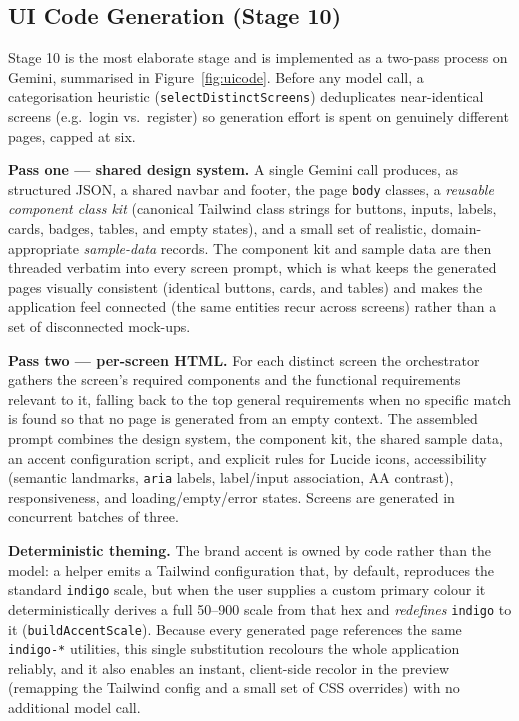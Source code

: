 \documentclass[12pt,a4paper,oneside]{report}
\begin{document}
\subsection{UI Code Generation (Stage 10)}
Stage 10 is the most elaborate stage and is implemented as a two-pass process on Gemini, summarised in Figure~\ref{fig:uicode}. Before any model call, a categorisation heuristic (\texttt{selectDistinctScreens}) deduplicates near-identical screens (e.g.\ login vs.\ register) so generation effort is spent on genuinely different pages, capped at six.

\textbf{Pass one --- shared design system.} A single Gemini call produces, as structured JSON, a shared navbar and footer, the page \texttt{body} classes, a \emph{reusable component class kit} (canonical Tailwind class strings for buttons, inputs, labels, cards, badges, tables, and empty states), and a small set of realistic, domain-appropriate \emph{sample-data} records. The component kit and sample data are then threaded verbatim into every screen prompt, which is what keeps the generated pages visually consistent (identical buttons, cards, and tables) and makes the application feel connected (the same entities recur across screens) rather than a set of disconnected mock-ups.

\textbf{Pass two --- per-screen HTML.} For each distinct screen the orchestrator gathers the screen's required components and the functional requirements relevant to it, falling back to the top general requirements when no specific match is found so that no page is generated from an empty context. The assembled prompt combines the design system, the component kit, the shared sample data, an accent configuration script, and explicit rules for Lucide icons, accessibility (semantic landmarks, \texttt{aria} labels, label/input association, AA contrast), responsiveness, and loading/empty/error states. Screens are generated in concurrent batches of three.

\textbf{Deterministic theming.} The brand accent is owned by code rather than the model: a helper emits a Tailwind configuration that, by default, reproduces the standard \texttt{indigo} scale, but when the user supplies a custom primary colour it deterministically derives a full 50--900 scale from that hex and \emph{redefines} \texttt{indigo} to it (\texttt{buildAccentScale}). Because every generated page references the same \texttt{indigo-*} utilities, this single substitution recolours the whole application reliably, and it also enables an instant, client-side recolor in the preview (remapping the Tailwind config and a small set of CSS overrides) with no additional model call.
\end{document}
